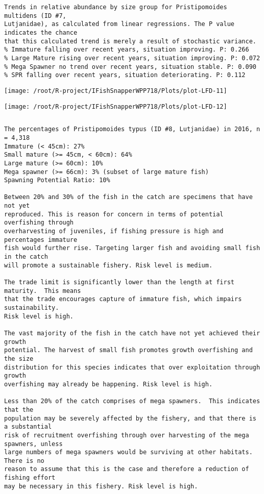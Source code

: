 \documentclass{report}\usepackage[]{graphicx}\usepackage[]{color}
\makeatletter
\def\maxwidth{ %
  \ifdim\Gin@nat@width>\linewidth
    \linewidth
  \else
    \Gin@nat@width
  \fi
}
\newenvironment{kframe}{%
 \def\at@end@of@kframe{}%
 \ifinner\ifhmode%
  \def\at@end@of@kframe{\end{minipage}}%
  \begin{minipage}{\columnwidth}%
 \fi\fi%
 \def\FrameCommand##1{\hskip\@totalleftmargin \hskip-\fboxsep
 \colorbox{shadecolor}{##1}\hskip-\fboxsep
     \hskip-\linewidth \hskip-\@totalleftmargin \hskip\columnwidth}%
 \MakeFramed {\advance\hsize-\width
   \@totalleftmargin\z@ \linewidth\hsize
   \@setminipage}}%
 {\par\unskip\endMakeFramed%
 \at@end@of@kframe}
\newenvironment{knitrout}{}{} %
\makeatother
\begin{document}
\begin{knitrout}
\begin{kframe}
\begin{verbatim}
Trends in relative abundance by size group for Pristipomoides multidens (ID #7,
Lutjanidae), as calculated from linear regressions. The P value indicates the chance
that this calculated trend is merely a result of stochastic variance.
% Immature falling over recent years, situation improving. P: 0.266
% Large Mature rising over recent years, situation improving. P: 0.072
% Mega Spawner no trend over recent years, situation stable. P: 0.090
% SPR falling over recent years, situation deteriorating. P: 0.112
\end{verbatim}
\end{kframe}
\texttt{[image: /root/R-project/IFishSnapperWPP718/Plots/plot-LFD-11]} 

\texttt{[image: /root/R-project/IFishSnapperWPP718/Plots/plot-LFD-12]} 
\begin{kframe}\begin{verbatim}
\end{verbatim}
\end{kframe}
\clearpage
\newpage
\begin{kframe}\begin{verbatim}The percentages of Pristipomoides typus (ID #8, Lutjanidae) in 2016, n = 4,318
Immature (< 45cm): 27%
Small mature (>= 45cm, < 60cm): 64%
Large mature (>= 60cm): 10%
Mega spawner (>= 66cm): 3% (subset of large mature fish)
Spawning Potential Ratio: 10%
 
Between 20% and 30% of the fish in the catch are specimens that have not yet
reproduced. This is reason for concern in terms of potential overfishing through
overharvesting of juveniles, if fishing pressure is high and percentages immature
fish would further rise. Targeting larger fish and avoiding small fish in the catch
will promote a sustainable fishery. Risk level is medium.

The trade limit is significantly lower than the length at first maturity.  This means
that the trade encourages capture of immature fish, which impairs sustainability.
Risk level is high.

The vast majority of the fish in the catch have not yet achieved their growth
potential. The harvest of small fish promotes growth overfishing and the size
distribution for this species indicates that over exploitation through growth
overfishing may already be happening. Risk level is high.

Less than 20% of the catch comprises of mega spawners.  This indicates that the
population may be severely affected by the fishery, and that there is a substantial
risk of recruitment overfishing through over harvesting of the mega spawners, unless
large numbers of mega spawners would be surviving at other habitats. There is no
reason to assume that this is the case and therefore a reduction of fishing effort
may be necessary in this fishery. Risk level is high.
 

\end{verbatim}
\end{kframe}
\end{knitrout}
\end{document}
